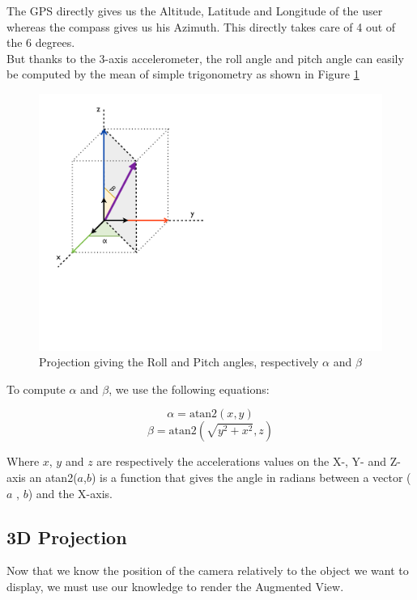 The GPS directly gives us the Altitude, Latitude and Longitude of the user whereas the compass gives us his Azimuth. This directly takes care of 4 out of the 6 degrees.\\

But thanks to the 3-axis accelerometer, the roll angle and pitch angle can easily be computed by the mean of simple trigonometry as shown in Figure \ref{fig:six_degrees_angles}

\begin{figure}[ht]
\center
\includegraphics[scale=0.5]{pics/six_degrees_angles}
\caption{Projection giving the Roll and Pitch angles, respectively $\alpha$ and $\beta$}
\label{fig:six_degrees_angles}
\end{figure}

To compute $\alpha$ and $\beta$, we use the following equations:

\[\alpha = \textrm{atan2}(x, y)\]
\[\beta = \textrm{atan2}(\sqrt{y^2+x^2}, z)\]

Where $x$, $y$ and $z$ are respectively the accelerations values on the X-, Y- and Z-axis an atan2($a${},{}$b$) is a function that gives the angle in radians between a vector ($a$ , $b$) and the X-axis.

\subsection{3D Projection}

Now that we know the position of the camera relatively to the object we want to display, we must use our knowledge to render the Augmented View.\\

